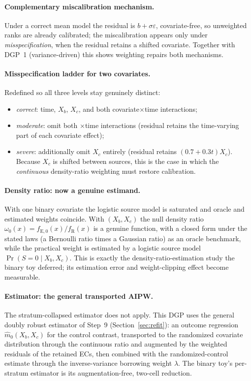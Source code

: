 \documentclass[11pt]{article}
\newcommand{\R}{\mathrm{R}}
\newcommand{\E}{\mathrm{E}}
\begin{document}
\paragraph{Complementary miscalibration mechanism.} Under a correct mean model the residual is $b+\sigma\varepsilon$, covariate-free, so unweighted ranks are already calibrated; the miscalibration appears only under \emph{misspecification}, when the residual retains a shifted covariate. Together with DGP~1 (variance-driven) this shows weighting repairs both mechanisms.

\paragraph{Misspecification ladder for two covariates.} Redefined so all three levels stay genuinely distinct:
\begin{itemize}
    \item \emph{correct}: time, $X_b$, $X_c$, and both covariate$\times$time interactions;
    \item \emph{moderate}: omit both $\times$time interactions (residual retains the time-varying part of each covariate effect);
    \item \emph{severe}: additionally omit $X_c$ entirely (residual retains $(0.7+0.3t)X_c$). Because $X_c$ is shifted between sources, this is the case in which the \emph{continuous} density-ratio weighting must restore calibration.
\end{itemize}

\paragraph{Density ratio: now a genuine estimand.} With one binary covariate the logistic source model is saturated and oracle and estimated weights coincide. With $(X_b,X_c)$ the null density ratio $\omega_0(x)=f_{\E,0}(x)/f_{\R}(x)$ is a genuine function, with a closed form under the stated laws (a Bernoulli ratio times a Gaussian ratio) as an oracle benchmark, while the practical weight is estimated by a logistic source model $\Pr(S{=}0\mid X_b,X_c)$. This is exactly the density-ratio-estimation study the binary toy deferred; its estimation error and weight-clipping effect become measurable.

\paragraph{Estimator: the general transported AIPW.} The stratum-collapsed estimator does not apply. This DGP uses the general doubly robust estimator of Step~9 (Section~\ref{sec:refit}): an outcome regression $\widehat m_0(X_b,X_c)$ for the control contrast, transported to the randomized covariate distribution through the continuous ratio and augmented by the weighted residuals of the retained ECs, then combined with the randomized-control estimate through the inverse-variance borrowing weight $\lambda$. The binary toy's per-stratum estimator is its augmentation-free, two-cell reduction.
\end{document}
